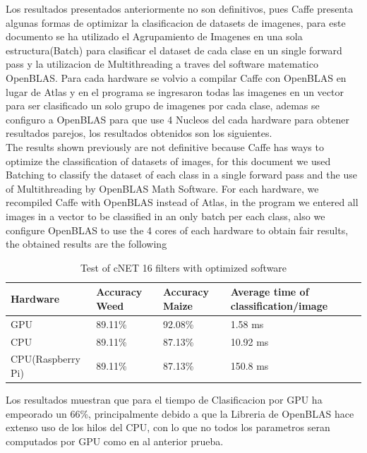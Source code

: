 \documentclass[conference]{IEEEtran}
\begin{document}
Los resultados presentados anteriormente no son definitivos, pues Caffe presenta algunas formas de optimizar la clasificacion de datasets de imagenes, para este documento se ha utilizado el Agrupamiento de Imagenes en una sola estructura(Batch) para clasificar el dataset de cada clase en un  single forward pass y la utilizacion de Multithreading a traves del software matematico OpenBLAS. Para cada hardware se volvio a compilar Caffe con OpenBLAS en lugar de Atlas y en el programa se ingresaron todas las imagenes en un vector para ser clasificado un solo grupo de imagenes por cada clase, ademas se  configuro a OpenBLAS para que use 4 Nucleos del cada hardware para obtener resultados parejos, los resultados obtenidos son los siguientes. \\

The results shown previously are not definitive because Caffe has ways to optimize the classification of datasets of images, for this document we used Batching to classify the dataset of each class in a single forward pass and the use of Multithreading by OpenBLAS Math Software. For each hardware, we recompiled Caffe with OpenBLAS instead of Atlas, in the program we entered all images in a vector to be classified in an only batch per each class, also we configure OpenBLAS to use the 4 cores of each hardware to obtain fair results, the obtained results are the following \\ 

\begin{table}[h!]
\centering
\begin{tabular}[c c c c]{|p{2.2 cm}|p{1.1cm}|p{1.1cm}|p{2.4cm}|}  
 \hline
   \textbf{Hardware } & \textbf{Accuracy Weed} & \textbf{Accuracy Maize} &  \textbf{Average time of classification/image}\\ 
 \hline 
 GPU & 89.11\% & 92.08\% & 1.58 ms  \\ [0.95ex]
 \hline
 CPU & 89.11\% & 87.13\% & 10.92  ms \\ [0.95ex]
  \hline
   CPU(Raspberry Pi) & 89.11\% & 87.13\% & 150.8 ms \\ [0.95ex]
  \hline
\end{tabular}
\caption{Test of cNET 16 filters with optimized software}
\label{table:5}
\end{table}

Los resultados muestran que para el tiempo de Clasificacion por GPU ha empeorado un 66\%, principalmente debido a que la Libreria de OpenBLAS hace extenso uso de los hilos del CPU, con lo que no todos los parametros seran computados por GPU como en al anterior prueba. \\
	
\end{document}
